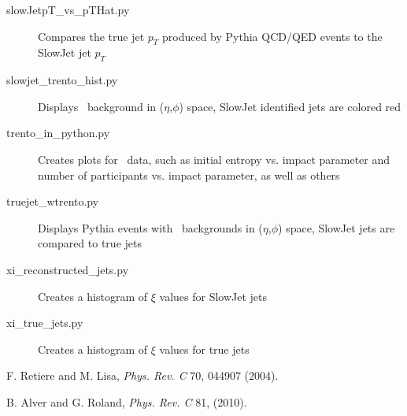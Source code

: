 \documentclass[11pt]{article}
\begin{document}
\begin{description}
\item[slowJetpT\_vs\_pTHat.py] Compares the true jet $p_T$ produced by Pythia QCD/QED events to the SlowJet jet $p_T$ 
\item[slowjet\_trento\_hist.py] Displays \trento\ background in ($\eta$,$\phi$) space, SlowJet identified jets are colored red
\item[trento\_in\_python.py] Creates plots for \trento\ data, such as initial entropy vs. impact parameter and number of participants vs. impact parameter, as well as others
\item[truejet\_wtrento.py] Displays Pythia events with \trento\ backgrounds in ($\eta$,$\phi$) space, SlowJet jets are compared to true jets
\item[xi\_reconstructed\_jets.py] Creates a histogram of $\xi$ values for SlowJet jets
\item[xi\_true\_jets.py] Creates a histogram of $\xi$ values for true jets
\end{description}

\begin{thebibliography}{10}

F. Retiere and M. Lisa, {\em Phys. Rev. C} 70, 044907 (2004).

B. Alver and G. Roland, {\em Phys. Rev. C} 81, (2010).

\end{thebibliography}
\end{document}
